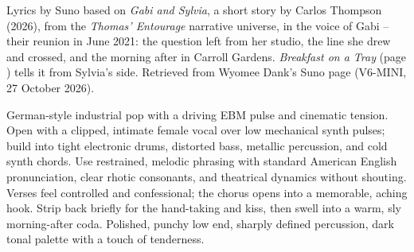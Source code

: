 
\label{sec:breakfast-in-my-bed}
\begin{notes}
Lyrics by Suno based on \emph{Gabi and Sylvia}, a short story by Carlos Thompson (2026), from the \emph{Thomas' Entourage} narrative universe, in the voice of Gabi -- their reunion in June 2021: the question left from her studio, the line she drew and crossed, and the morning after in Carroll Gardens. \emph{Breakfast on a Tray} (page \pageref{sec:breakfast-on-a-tray}) tells it from Sylvia's side. Retrieved from Wyomee Dank's Suno page (V6-MINI, 27 October 2026).
\end{notes}
\begin{style}
German-style industrial pop with a driving EBM pulse and cinematic tension. Open with a clipped, intimate female vocal over low mechanical synth pulses; build into tight electronic drums, distorted bass, metallic percussion, and cold synth chords. Use restrained, melodic phrasing with standard American English pronunciation, clear rhotic consonants, and theatrical dynamics without shouting. Verses feel controlled and confessional; the chorus opens into a memorable, aching hook. Strip back briefly for the hand-taking and kiss, then swell into a warm, sly morning-after coda. Polished, punchy low end, sharply defined percussion, dark tonal palette with a touch of tenderness.
\end{style}
